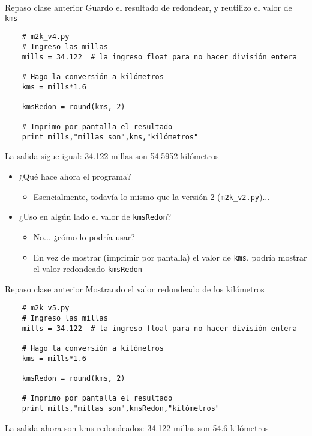 \documentclass[9pt]{beamer}
\begin{document}
\begin{frame}[fragile]{Repaso clase anterior}
Guardo el resultado de redondear, y reutilizo el valor de \verb|kms|
\footnotesize{\begin{verbatim}
	# m2k_v4.py
	# Ingreso las millas
	mills = 34.122  # la ingreso float para no hacer división entera
	
	# Hago la conversión a kilómetros
	kms = mills*1.6
	
	kmsRedon = round(kms, 2)
	
	# Imprimo por pantalla el resultado
	print mills,"millas son",kms,"kilómetros"
	\end{verbatim}}\pause
La salida sigue igual: 34.122 millas son 54.5952 kilómetros\pause
\begin{itemize}
		\item ¿Qué hace ahora el programa?\pause
		\begin{itemize}
			\item Esencialmente, todavía lo mismo que la versión 2 (\verb|m2k_v2.py|)...
		\end{itemize}\pause
		\item ¿Uso en algún lado el valor de \verb|kmsRedon|?\pause
		\begin{itemize}
			\item No... ¿cómo lo podría usar?\pause
			\item En vez de mostrar (imprimir por pantalla) el valor de \verb|kms|, podría mostrar el valor redondeado \verb|kmsRedon|
		\end{itemize}
\end{itemize}

\end{frame}



\begin{frame}[fragile]{Repaso clase anterior}
Mostrando el valor redondeado de los kilómetros
\footnotesize{\begin{verbatim}
	# m2k_v5.py
	# Ingreso las millas
	mills = 34.122  # la ingreso float para no hacer división entera
	
	# Hago la conversión a kilómetros
	kms = mills*1.6
	
	kmsRedon = round(kms, 2)
	
	# Imprimo por pantalla el resultado
	print mills,"millas son",kmsRedon,"kilómetros"
	\end{verbatim}}\pause

La salida ahora son kms redondeados: 34.122 millas son 54.6 kilómetros%
\end{frame}
\end{document}
